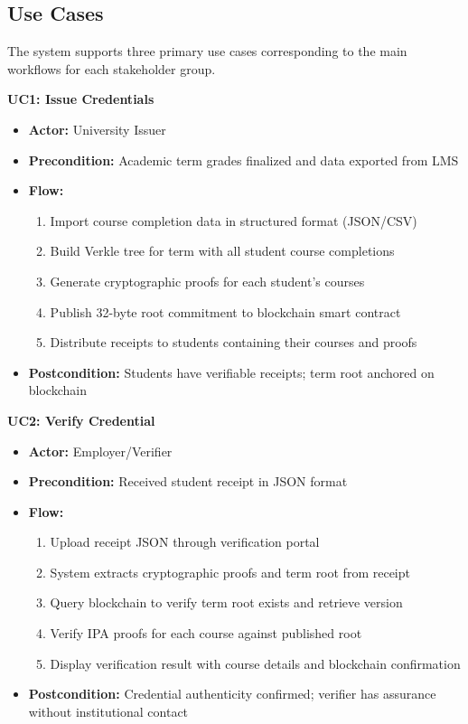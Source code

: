 \subsection{Use Cases}
\label{subsec:use-cases}

The system supports three primary use cases corresponding to the main workflows for each stakeholder group.

\textbf{UC1: Issue Credentials}

\begin{itemize}
    \item \textbf{Actor:} University Issuer
    \item \textbf{Precondition:} Academic term grades finalized and data exported from LMS
    \item \textbf{Flow:}
    \begin{enumerate}
        \item Import course completion data in structured format (JSON/CSV)
        \item Build Verkle tree for term with all student course completions
        \item Generate cryptographic proofs for each student's courses
        \item Publish 32-byte root commitment to blockchain smart contract
        \item Distribute receipts to students containing their courses and proofs
    \end{enumerate}
    \item \textbf{Postcondition:} Students have verifiable receipts; term root anchored on blockchain
\end{itemize}

\textbf{UC2: Verify Credential}

\begin{itemize}
    \item \textbf{Actor:} Employer/Verifier
    \item \textbf{Precondition:} Received student receipt in JSON format
    \item \textbf{Flow:}
    \begin{enumerate}
        \item Upload receipt JSON through verification portal
        \item System extracts cryptographic proofs and term root from receipt
        \item Query blockchain to verify term root exists and retrieve version
        \item Verify IPA proofs for each course against published root
        \item Display verification result with course details and blockchain confirmation
    \end{enumerate}
    \item \textbf{Postcondition:} Credential authenticity confirmed; verifier has assurance without institutional contact
\end{itemize}


